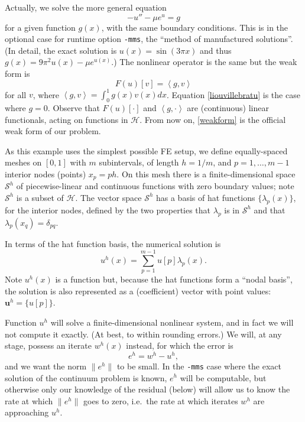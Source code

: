 \documentclass[letterpaper,final,12pt,reqno]{amsart}
\newcommand{\bu}{\mathbf{u}}
\newcommand{\ip}[2]{\left<#1,#2\right>}
\begin{document}
Actually, we solve the more general equation
  $$-u'' - \mu e^u = g$$
for a given function $g(x)$, with the same boundary conditions.  This is in the optional case for runtime option \texttt{-mms}, the ``method of manufactured solutions''.  (In detail, the exact solution is $u(x)=\sin(3\pi x)$ and thus $g(x)=9\pi^2 u(x)-\mu e^{u(x)}$.)  The nonlinear operator is the same but the weak form is
\begin{equation}
  F(u)[v] = \ip{g}{v} \label{weakform}
\end{equation}
for all $v$, where $\ip{g}{v} = \int_0^1 g(x) v(x) dx$.  Equation \eqref{liouvillebratu} is the case where $g=0$.  Observe that $F(u)[\cdot]$ and $\ip{g}{\cdot}$ are (continuous) linear functionals, acting on functions in $\mathcal{H}$.  From now on, \eqref{weakform} is the official weak form of our problem.

As this example uses the simplest possible FE setup, we define equally-spaced meshes on $[0,1]$ with $m$ subintervals, of length $h=1/m$, and $p=1,\dots,m-1$ interior nodes (points) $x_p=ph$.  On this mesh there is a finite-dimensional space $\mathcal{S}^h$ of piecewise-linear and continuous functions with zero boundary values; note $\mathcal{S}^h$ is a subset of $\mathcal{H}$.  The vector space $\mathcal{S}^h$ has a basis of hat functions $\{\lambda_p(x)\}$, for the interior nodes, defined by the two properties that $\lambda_p$ is in $\mathcal{S}^h$ and that $\lambda_p(x_q)=\delta_{pq}$.

In terms of the hat function basis, the numerical solution is
\begin{equation}
  u^h(x) = \sum_{p=1}^{m-1} u[p] \lambda_p(x).  \label{fesolution}
\end{equation}
Note $u^h(x)$ is a function but, because the hat functions form a ``nodal basis'', the solution is also represented as a (coefficient) vector with point values: $\bu^h =\{u[p]\}$.

Function $u^h$ will solve a finite-dimensional nonlinear system, and in fact we will not compute it exactly.  (At best, to within rounding errors.)  We will, at any stage, possess an iterate $w^h(x)$ instead, for which the error is
\begin{equation}
  e^h = w^h - u^h,  \label{error}
\end{equation}
and we want the norm $\|e^h\|$ to be small.  In the \texttt{-mms} case where the exact solution of the continuum problem is known, $e^h$ will be computable, but otherwise only our knowledge of the residual (below) will allow us to know the rate at which $\|e^h\|$ goes to zero, i.e.~the rate at which iterates $w^h$ are approaching $u^h$.
\end{document}
